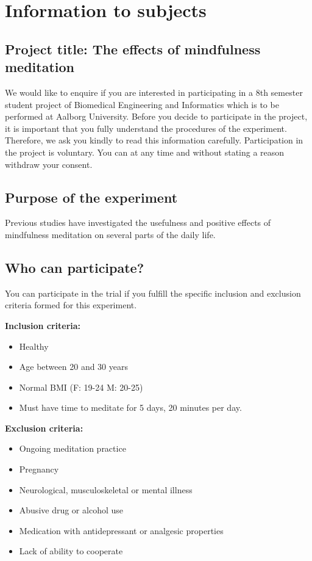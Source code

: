\chapter{Information to subjects}
\section{Project title: The effects of mindfulness meditation} 
We would like to enquire if you are interested in participating in a 8th semester student project of Biomedical Engineering and Informatics which is to be performed at Aalborg University.
Before you decide to participate in the project, it is important that you fully understand the procedures of the experiment. Therefore, we ask you kindly to read this information carefully.
Participation in the project is voluntary. You can at any time and without stating a reason withdraw your consent.

\section{Purpose of the experiment}
Previous studies have investigated the usefulness and positive effects of mindfulness meditation on several parts of the daily life.

\section{Who can participate?}
You can participate in the trial if you fulfill the specific inclusion and exclusion criteria formed for this experiment. 

\textbf{Inclusion criteria:}
	\vspace{-.5cm}
\begin{itemize}
	\item Healthy
	\vspace{-.3cm}
	\item Age between 20 and 30 years
	\vspace{-.3cm}
	\item Normal BMI (F: 19-24 M: 20-25)
	\vspace{-.3cm}
	\item Must have time to meditate for 5 days, 20 minutes per day.
\end{itemize}

\textbf{Exclusion criteria:}
	\vspace{-.5cm}
\begin{itemize}
	\item Ongoing meditation practice 
	\vspace{-.3cm}
	\item Pregnancy 
	\vspace{-.3cm}
	\item Neurological, musculoskeletal or mental illness
	\vspace{-.3cm}
	\item Abusive drug or alcohol use
	\vspace{-.3cm}
	\item Medication with antidepressant or analgesic properties
\vspace{-.3cm}
	\item Lack of ability to cooperate
\end{itemize}

